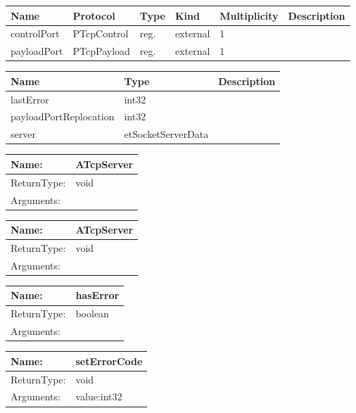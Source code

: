

\begin{tabular}[ht]{|l|l|l|l|l|p{5cm}|}
\hline
\textbf{Name} & \textbf{Protocol} & \textbf{Type} & \textbf{Kind} & \textbf{Multiplicity} & \textbf{Description}\\
\hline
controlPort & PTcpControl & reg. & external & 1 & \\
\hline
payloadPort & PTcpPayload & reg. & external & 1 & \\
\hline
\end{tabular}


\begin{par}

\end{par}


\begin{tabular}[ht]{|l|l|p{8cm}|}
\hline
\textbf{Name} & \textbf{Type} & \textbf{Description}\\
\hline
lastError & int32 & \\
\hline
payloadPortReplocation & int32 & \\
\hline
server & etSocketServerData & \\
\hline
\end{tabular}

\begin{tabular}[ht]{|l|l|}
\hline		
	Name: & ATcpServer\\
	\hline
	ReturnType: &  void\\
	\hline
	Arguments: & \\
	\hline
\end{tabular}
\newline\newline\newline
\begin{tabular}[ht]{|l|l|}
\hline		
	Name: & ATcpServer\\
	\hline
	ReturnType: &  void\\
	\hline
	Arguments: & \\
	\hline
\end{tabular}
\newline\newline\newline
\begin{tabular}[ht]{|l|l|}
\hline		
	Name: & hasError\\
	\hline
	ReturnType: &  boolean\\
	\hline
	Arguments: & \\
	\hline
\end{tabular}
\newline\newline\newline
\begin{tabular}[ht]{|l|l|}
\hline		
	Name: & setErrorCode\\
	\hline
	ReturnType: &  void\\
	\hline
	Arguments: & value:int32\\
	\hline
\end{tabular}
\newline\newline\newline
